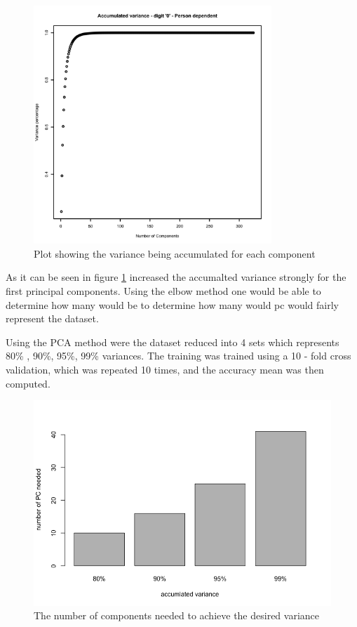 \begin{figure}[H]
\centering
\includegraphics[width = 0.8\textwidth]{graphics/accumulated-2-1-person-dependent.png}
\caption{Plot showing the variance being accumulated for each component}
\label{fig:PCa_num_comp}
\end{figure}

As it can be seen in figure \ref{fig:PCa_num_comp} increased the accumalted
variance strongly for the first principal components. 
 Using the elbow method one would be able to determine how 
 many would be to determine how many would pc would fairly represent the dataset. 


Using the PCA method were the dataset reduced into 4 sets 
 which represents 80\% , 90\%, 95\%, 99\% variances. 
 The training was trained using a 10 - fold cross validation, 
 which was repeated 10 times, and the accuracy mean was then computed. 

\begin{figure}[H]
\centering
\includegraphics[width = \textwidth]{graphics/PCA_barplot.png}
\caption{The number of components needed to achieve the desired variance}
\label{fig:pca_comp}
\end{figure}

